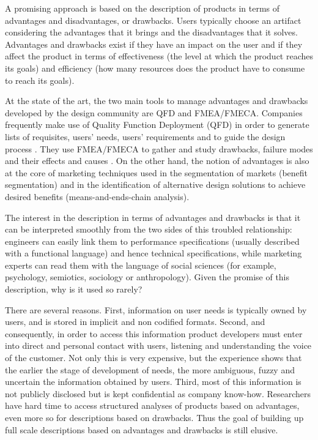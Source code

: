 \documentclass[]{book}
\begin{document}
A promising approach is based on the description of products in terms of
advantages and disadvantages, or drawbacks. Users typically choose an
artifact considering the advantages that it brings and the disadvantages
that it solves. Advantages and drawbacks exist if they have an impact on
the user and if they affect the product in terms of effectiveness (the
level at which the product reaches its goals) and efficiency (how many
resources does the product have to consume to reach its goals).

At the state of the art, the two main tools to manage advantages and
drawbacks developed by the design community are QFD and FMEA/FMECA.
Companies frequently make use of Quality Function Deployment (QFD) in
order to generate lists of requisites, users' needs, users' requirements
and to guide the design process \citep{carnevalli2008review}. They use
FMEA/FMECA to gather and study drawbacks, failure modes and their
effects and causes \citep{liu2013risk}. On the other hand, the notion of
advantages is also at the core of marketing techniques used in the
segmentation of markets (benefit segmentation) and in the identification
of alternative design solutions to achieve desired benefits
(means-and-ends-chain analysis).

The interest in the description in terms of advantages and drawbacks is
that it can be interpreted smoothly from the two sides of this troubled
relationship: engineers can easily link them to performance
specifications (usually described with a functional language) and hence
technical specifications, while marketing experts can read them with the
language of social sciences (for example, psychology, semiotics,
sociology or anthropology). Given the promise of this description, why
is it used so rarely?

There are several reasons. First, information on user needs is typically
owned by users, and is stored in implicit and non codified formats.
Second, and consequently, in order to access this information product
developers must enter into direct and personal contact with users,
listening and understanding the voice of the customer. Not only this is
very expensive, but the experience shows that the earlier the stage of
development of needs, the more ambiguous, fuzzy and uncertain the
information obtained by users. Third, most of this information is not
publicly disclosed but is kept confidential as company know-how.
Researchers have hard time to access structured analyses of products
based on advantages, even more so for descriptions based on drawbacks.
Thus the goal of building up full scale descriptions based on advantages
and drawbacks is still elusive.
\end{document}
